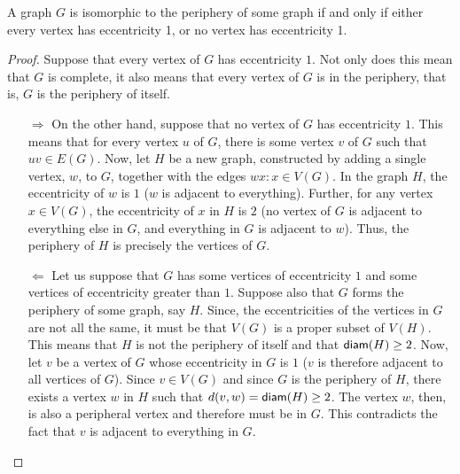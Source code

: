 \documentclass[../basic_graph_theory.tex]{subfiles}
\begin{document}
\begin{Thm}{}{}
  A graph $G$ is isomorphic to the periphery of some graph if and only if either every vertex has eccentricity 1, or no vertex has eccentricity 1.
\end{Thm}
\begin{proof}
  Suppose that every vertex of $G$ has eccentricity $1$. Not only does this mean that $G$ is complete, it also means that every vertex of $G$ is in the periphery, that is, $G$ is the periphery of itself.
  \begin{itemize}
    \item[$\Longrightarrow$] On the other hand, suppose that no vertex of $G$ has eccentricity $1$. This means that for every vertex $u$ of $G$, there is some vertex $v$ of $G$ such that $uv \in E(G)$. Now, let $H$ be a new graph, constructed by adding a single vertex, $w$, to $G$, together with the edges ${wx:x \in V (G)}$. In the graph $H$, the eccentricity of $w$ is $1$ ($w$ is adjacent to everything). Further, for any vertex $x \in V (G)$, the eccentricity of $x$ in $H$ is $2$ (no vertex of $G$ is adjacent to everything else in $G$, and everything in $G$ is adjacent to $w$). Thus, the periphery of $H$ is precisely the vertices of $G$.
    \item[$\Longleftarrow$] Let us suppose that $G$ has some vertices of eccentricity $1$ and some vertices of eccentricity greater than $1$. Suppose also that $G$ forms the periphery of some graph, say $H$. Since, the eccentricities of the vertices in $G$ are not all the same, it must be that $V(G)$ is a proper subset of $V(H)$. This means that $H$ is not the periphery of itself and that $\operatorname{\mathsf{diam}}(H) \ge 2$. Now, let $v$ be a vertex of $G$ whose eccentricity in $G$ is $1$ ($v$ is therefore adjacent to all vertices of $G$). Since $v \in V(G)$ and since $G$ is the periphery of $H$, there exists a vertex $w$ in $H$ such that $d(v,w) = \operatorname{\mathsf{diam}}(H) \ge 2$. The vertex $w$, then, is also a peripheral vertex and therefore must be in $G$. This contradicts the fact that $v$ is adjacent to everything in $G$.
  \end{itemize}
\end{proof}
\end{document}
